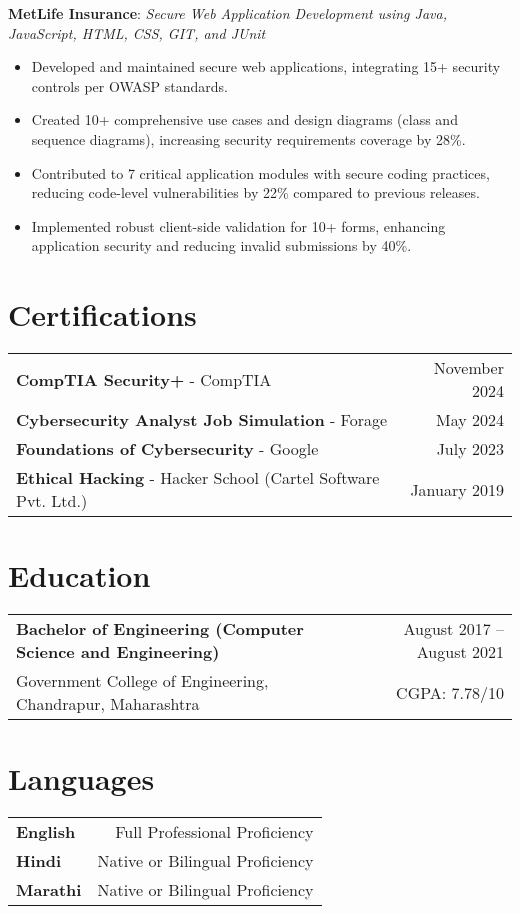 \documentclass[a4paper,11pt]{article}
\newcommand{\sectiontitle}[1]{\section*{#1}}
\newcommand{\projectentry}[2]{
\raggedright\textbf{\textcolor{primary}{#1}}: \textit{#2} \\
}
\begin{document}
\projectentry{MetLife Insurance}{Secure Web Application Development using Java, JavaScript, HTML, CSS, GIT, and JUnit}
\begin{itemize}
\item Developed and maintained secure web applications, integrating 15+ security controls per OWASP standards.
\item Created 10+ comprehensive use cases and design diagrams (class and sequence diagrams), increasing security requirements coverage by 28\%.
\item Contributed to 7 critical application modules with secure coding practices, reducing code-level vulnerabilities by 22\% compared to previous releases.
\item Implemented robust client-side validation for 10+ forms, enhancing application security and reducing invalid submissions by 40\%.
\end{itemize}

\sectiontitle{Certifications}
\begin{tabularx}{\textwidth}{X r}
\textbf{CompTIA Security+} - CompTIA & November 2024 \\
\textbf{Cybersecurity Analyst Job Simulation} - Forage & May 2024 \\
\textbf{Foundations of Cybersecurity} - Google & July 2023 \\
\textbf{Ethical Hacking} - Hacker School (Cartel Software Pvt. Ltd.) & January 2019 \\
\end{tabularx}

\sectiontitle{Education}
\begin{tabularx}{\textwidth}{X r}
\textbf{Bachelor of Engineering (Computer Science and Engineering)} & August 2017 -- August 2021 \\
Government College of Engineering, Chandrapur, Maharashtra & CGPA: 7.78/10 \\
\end{tabularx}

\sectiontitle{Languages}
\begin{tabularx}{\textwidth}{X r}
\textbf{English} & Full Professional Proficiency \\
\textbf{Hindi} & Native or Bilingual Proficiency \\
\textbf{Marathi} & Native or Bilingual Proficiency \\
\end{tabularx}
\end{document}
